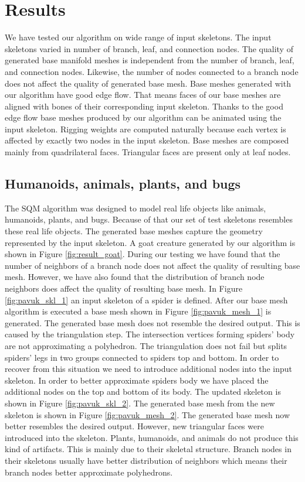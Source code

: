 \chapter{Results}

We have tested our algorithm on wide range of input skeletons.
The input skeletons varied in number of branch, leaf, and connection nodes.
The quality of generated base manifold meshes is independent from the number of branch, leaf, and connection nodes.
Likewise, the number of nodes connected to a branch node does not affect the quality of generated base mesh.
Base meshes generated with our algorithm have good edge flow.
That means faces of our base meshes are aligned with bones of their corresponding input skeleton.
Thanks to the good edge flow base meshes produced by our algorithm can be animated using the input skeleton.
Rigging weights are computed naturally because each vertex is affected by exactly two nodes in the input skeleton.
Base meshes are composed mainly from quadrilateral faces.
Triangular faces are present only at leaf nodes.

\section{Humanoids, animals, plants, and bugs}

The SQM algorithm was designed to model real life objects like animals, humanoids, plants, and bugs.
Because of that our set of test skeletons resembles these real life objects.
The generated base meshes capture the geometry represented by the input skeleton.
A goat creature generated by our algorithm is shown in Figure \ref{fig:result_goat}.
During our testing we have found that the number of neighbors of a branch node does not affect the quality of resulting base mesh.
However, we have also found that the distribution of branch node neighbors does affect the quality of resulting base mesh.
In Figure \ref{fig:pavuk_skl_1} an input skeleton of a spider is defined.
After our base mesh algorithm is executed a base mesh shown in Figure \ref{fig:pavuk_mesh_1} is generated.
The generated base mesh does not resemble the desired output.
This is caused by the triangulation step.
The intersection vertices forming spiders’ body are not approximating a polyhedron.
The triangulation does not fail but splits spiders’ legs in two groups connected to spiders top and bottom.
In order to recover from this situation we need to introduce additional nodes into the input skeleton.
In order to better approximate spiders body we have placed the additional nodes on the top and bottom of its body.
The updated skeleton is shown in Figure \ref{fig:pavuk_skl_2}.
The generated base mesh from the new skeleton is shown in Figure \ref{fig:pavuk_mesh_2}.
The generated base mesh now better resembles the desired output.
However, new triangular faces were introduced into the skeleton.
Plants, humanoids, and animals do not produce this kind of artifacts.
This is mainly due to their skeletal structure.
Branch nodes in their skeletons usually have better distribution of neighbors which means their branch nodes better approximate polyhedrons.

